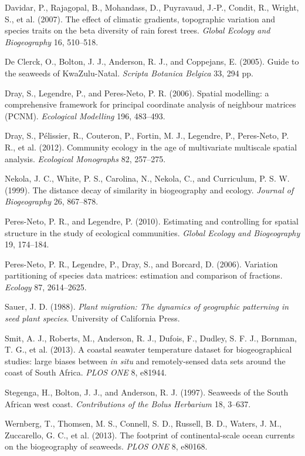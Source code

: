\documentclass[10pt,A4,]{article}
\begin{document}
\hypertarget{ref-Davidar2007}{}
Davidar, P., Rajagopal, B., Mohandass, D., Puyravaud, J.-P., Condit, R.,
Wright, S., et al. (2007). The effect of climatic gradients, topographic
variation and species traits on the beta diversity of rain forest trees.
\emph{Global Ecology and Biogeography} 16, 510--518.

\hypertarget{ref-DeClerck2005}{}
De Clerck, O., Bolton, J. J., Anderson, R. J., and Coppejans, E. (2005).
Guide to the seaweeds of KwaZulu-Natal. \emph{Scripta Botanica Belgica}
33, 294 pp.

\hypertarget{ref-Dray2006}{}
Dray, S., Legendre, P., and Peres-Neto, P. R. (2006). Spatial modelling:
a comprehensive framework for principal coordinate analysis of neighbour
matrices (PCNM). \emph{Ecological Modelling} 196, 483--493.

\hypertarget{ref-Dray2012a}{}
Dray, S., Pélissier, R., Couteron, P., Fortin, M. J., Legendre, P.,
Peres-Neto, P. R., et al. (2012). Community ecology in the age of
multivariate multiscale spatial analysis. \emph{Ecological Monographs}
82, 257--275.

\hypertarget{ref-Nekola1999}{}
Nekola, J. C., White, P. S., Carolina, N., Nekola, C., and Curriculum,
P. S. W. (1999). The distance decay of similarity in biogeography and
ecology. \emph{Journal of Biogeography} 26, 867--878.

\hypertarget{ref-PeresNeto2010}{}
Peres-Neto, P. R., and Legendre, P. (2010). Estimating and controlling
for spatial structure in the study of ecological communities.
\emph{Global Ecology and Biogeography} 19, 174--184.

\hypertarget{ref-Peres-Neto2006}{}
Peres-Neto, P. R., Legendre, P., Dray, S., and Borcard, D. (2006).
Variation partitioning of species data matrices: estimation and
comparison of fractions. \emph{Ecology} 87, 2614--2625.

\hypertarget{ref-Sauer1988}{}
Sauer, J. D. (1988). \emph{Plant migration: The dynamics of geographic
patterning in seed plant species}. University of California Press.

\hypertarget{ref-Smit2013}{}
Smit, A. J., Roberts, M., Anderson, R. J., Dufois, F., Dudley, S. F. J.,
Bornman, T. G., et al. (2013). A coastal seawater temperature dataset
for biogeographical studies: large biases between \emph{in situ} and
remotely-sensed data sets around the coast of South Africa. \emph{PLOS
ONE} 8, e81944.

\hypertarget{ref-Stegenga1997}{}
Stegenga, H., Bolton, J. J., and Anderson, R. J. (1997). Seaweeds of the
South African west coast. \emph{Contributions of the Bolus Herbarium}
18, 3--637.

\hypertarget{ref-Wernberg2013}{}
Wernberg, T., Thomsen, M. S., Connell, S. D., Russell, B. D., Waters, J.
M., Zuccarello, G. C., et al. (2013). The footprint of continental-scale
ocean currents on the biogeography of seaweeds. \emph{PLOS ONE} 8,
e80168.
\end{document}
